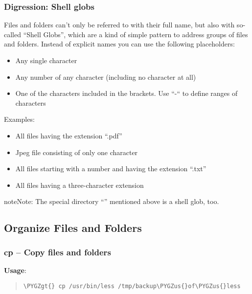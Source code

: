 \documentclass[a4paper,11pt,english]{sphinxmanual}
\def\PYGZus{\char`\_}
\def\PYGZgt{\char`\>}
\begin{document}
\subsubsection{Digression: Shell globs}
\label{introduction:digression-shell-globs}
Files and folders can’t only be referred to with their full name, but also with so-called “Shell Globs”, which are a kind of simple pattern to address groups of files and folders.  Instead of explicit names you can use the following placeholders:
\begin{itemize}
\item {} 
  Any single character

\item {} 
\code{*:}  Any number of any character (including no character at all)

\item {} 
\code{{[}...{]}:}    One of the characters included in the brackets.  Use “-“ to define ranges  of characters

\end{itemize}

Examples:
\begin{itemize}
\item {} 
  All files having the extension “.pdf”

\item {} 
  Jpeg file consisting of only one character

\item {} 
 All files starting with a number and having the extension “.txt”

\item {} 
  All files having a three-character extension

\end{itemize}

\begin{notice}{note}{Note:}
The special directory “\code{\textasciitilde{}}” mentioned above is a shell glob, too.
\end{notice}


\subsection{Organize Files and Folders}
\label{introduction:organize-files-and-folders}

\subsubsection{cp – Copy files and folders}
\label{introduction:cp-copy-files-and-folders}
\textbf{Usage}:  
\begin{quote}

\begin{Verbatim}[frame=single, rulecolor=\color{lightgray}, fontfamily=courier, commandchars=\\\{\}]
\PYGZgt{} cp /usr/bin/less /tmp/backup\PYGZus{}of\PYGZus{}less
\end{Verbatim}
\end{quote}
\end{document}
